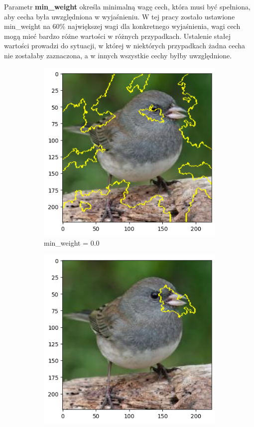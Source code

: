 Parametr \textbf{min\_weight} określa minimalną wagę cech, która musi być spełniona, aby cecha była uwzględniona w wyjaśnieniu.
W tej pracy zostało ustawione min\_weight na 60\% największej wagi dla konkretnego wyjaśnienia, wagi cech mogą mieć bardzo różne wartości w różnych przypadkach.
Ustalenie stałej wartości prowadzi do sytuacji, w której w niektórych przypadkach żadna cecha nie zostałaby zaznaczona, a w innych wszystkie cechy byłby uwzględnione.

\begin{figure}[h]
	\centering
	\begin{subfigure}[b]{0.3\textwidth}
		\includegraphics[width=.9\textwidth]{img/parameters/lime/min_weight_00}
		\caption{min\_weight = 0.0}  \label{rys:parameters_lime_numsamples_5}
	\end{subfigure}
	\begin{subfigure}[b]{0.3\textwidth}
		\centering\includegraphics[width=.9\textwidth]{img/parameters/lime/min_weight_03}

\end{subfigure}
\end{figure}
